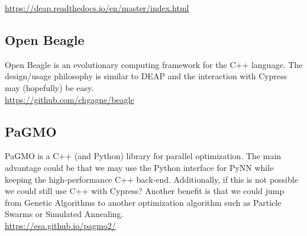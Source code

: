 \documentclass[11pt,a4paper]{article}
\begin{document}
\url{https://deap.readthedocs.io/en/master/index.html}

\subsection{Open Beagle}
Open Beagle is an evolutionary computing framework for the C++ language. 
The design/usage philosophy is similar to DEAP and the interaction with Cypress may (hopefully) be easy.\\

\url{https://github.com/chgagne/beagle}


\subsection{PaGMO}
PaGMO is a C++ (and Python) library for parallel optimization. 
The main advantage could be that we may use the Python interface for PyNN while keeping the high-performance C++ back-end.
Additionally, if this is not possible we could still use C++ with Cypress?
Another benefit is that we could jump from Genetic Algorithms to another optimization algorithm such as Particle Swarms or Simulated Annealing.\\

\url{https://esa.github.io/pagmo2/}
\end{document}
